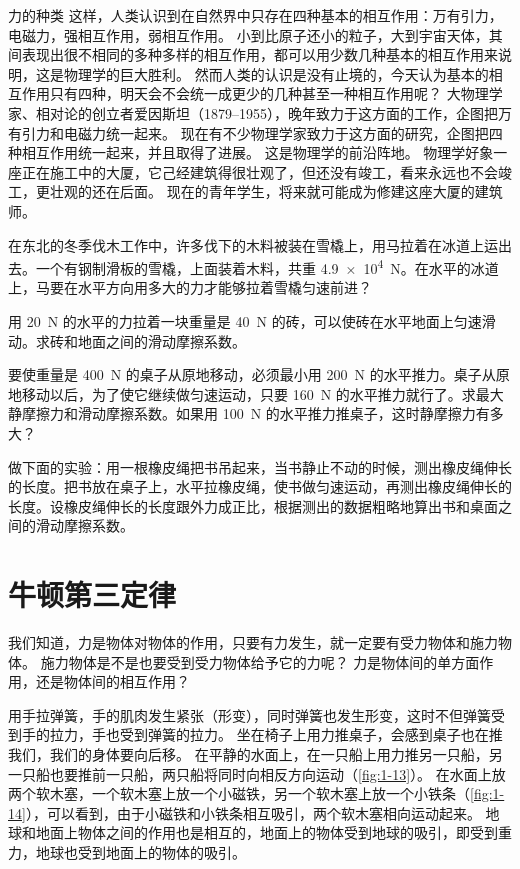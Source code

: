 \begin{Reading}{力的种类}
这样，人类认识到在自然界中只存在四种基本的相互作用：万有引力，电磁力，强相互作用，弱相互作用。
小到比原子还小的粒子，大到宇宙天体，其间表现出很不相同的多种多样的相互作用，都可以用少数几种基本的相互作用来说明，这是物理学的巨大胜利。
然而人类的认识是没有止境的，今天认为基本的相互作用只有四种，明天会不会统一成更少的几种甚至一种相互作用呢？
大物理学家、相对论的创立者爱因斯坦（1879--1955），晚年致力于这方面的工作，企图把万有引力和电磁力统一起来。
现在有不少物理学家致力于这方面的研究，企图把四种相互作用统一起来，并且取得了进展。
这是物理学的前沿阵地。
物理学好象一座正在施工中的大厦，它己经建筑得很壮观了，但还没有竣工，看来永远也不会竣工，更壮观的还在后面。
现在的青年学生，将来就可能成为修建这座大厦的建筑师。
\end{Reading}

\begin{Practice}
\begin{question}
\item  在东北的冬季伐木工作中，许多伐下的木料被装在雪橇上，用马拉着在冰道上运出去。一个有钢制滑板的雪橇，上面装着木料，共重 \qty{4.9e4}{N}。在水平的冰道上，马要在水平方向用多大的力才能够拉着雪橇匀速前进？
\item  用 \qty{20}{N} 的水平的力拉着一块重量是 \qty{40}{N} 的砖，可以使砖在水平地面上匀速滑动。求砖和地面之间的滑动摩擦系数。
\item  要使重量是 \qty{400}{N} 的桌子从原地移动，必须最小用 \qty{200}{N} 的水平推力。桌子从原地移动以后，为了使它继续做匀速运动，只要 \qty{160}{N} 的水平推力就行了。求最大静摩擦力和滑动摩擦系数。如果用 \qty{100}{N} 的水平推力推桌子，这时静摩擦力有多大？
\item  做下面的实验：用一根橡皮绳把书吊起来，当书静止不动的时候，测出橡皮绳伸长的长度。把书放在桌子上，水平拉橡皮绳，使书做匀速运动，再测出橡皮绳伸长的长度。设橡皮绳伸长的长度跟外力成正比，根据测出的数据粗略地算出书和桌面之间的滑动摩擦系数。
\end{question}
\end{Practice}

\section{牛顿第三定律}
我们知道，力是物体对物体的作用，只要有力发生，就一定要有受力物体和施力物体。
施力物体是不是也要受到受力物体给予它的力呢？
力是物体间的单方面作用，还是物体间的相互作用？

用手拉弹簧，手的肌肉发生紧张（形变），同时弹簧也发生形变，这时不但弹簧受到手的拉力，手也受到弹簧的拉力。
坐在椅子上用力推桌子，会感到桌子也在推我们，我们的身体要向后移。
在平静的水面上，在一只船上用力推另一只船，另一只船也要推前一只船，两只船将同时向相反方向运动（\cref{fig:1-13}）。
在水面上放两个软木塞，一个软木塞上放一个小磁铁，另一个软木塞上放一个小铁条（\cref{fig:1-14}），可以看到，由于小磁铁和小铁条相互吸引，两个软木塞相向运动起来。
地球和地面上物体之间的作用也是相互的，地面上的物体受到地球的吸引，即受到重力，地球也受到地面上的物体的吸引。

